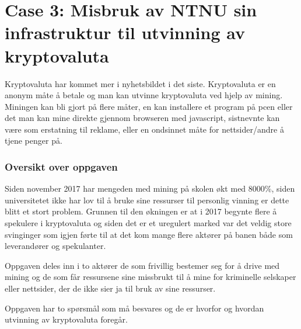 \section{Case 3: Misbruk av NTNU sin infrastruktur til utvinning av kryptovaluta}
\label{sec:case_krypto}
Kryptovaluta har kommet mer i nyhetsbildet i det siste. Kryptovaluta er en anonym måte å betale og man kan utvinne kryptovaluta ved hjelp av mining. Miningen kan bli gjort på flere måter, en kan installere et program på pcen eller det man kan mine direkte gjennom browseren med javascript, sistnevnte kan være som erstatning til reklame, eller en ondsinnet måte for nettsider/andre å tjene penger på.




\subsubsection{Oversikt over oppgaven}
Siden november 2017 har mengeden med mining på skolen økt med 8000\%, siden universitetet ikke har lov til å bruke sine ressurser til personlig vinning er dette blitt et stort problem. Grunnen til den økningen er at i 2017 begynte flere å spekulere i kryptovaluta og siden det er et uregulert marked var det veldig store svinginger som igjen førte til at det kom mange flere aktører på banen både som leverandører og spekulanter. 

Oppgaven deles inn i to aktører de som frivillig bestemer seg for å drive med mining og de som får ressursene sine missbrukt til å mine for kriminelle selskaper eller nettsider, der de ikke sier ja til bruk av sine ressurser.

Oppgaven har to spørsmål som må besvares og de er hvorfor og hvordan utvinning av kryptovaluta foregår.